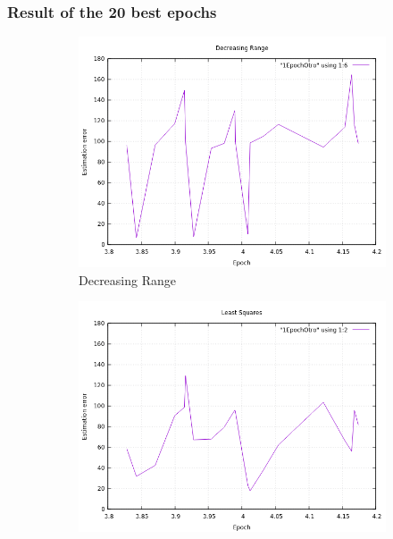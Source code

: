 \clearpage

\subsubsection{Result of the 20 best epochs}

\begin{figure}[!htb]
	\begin{subfigure}[b]{0.5\textwidth}
		\includegraphics[width=\linewidth]{images/resultsStellar/20Epochs1Epoch/1EpochOtroDR.png}
		\caption{Decreasing Range}
	\end{subfigure}
	\hfill
	\begin{subfigure}[b]{0.5\textwidth}
		\includegraphics[width=\linewidth]{images/resultsStellar/20Epochs1Epoch/1EpochOtroLS1.png}

\end{subfigure}
\end{figure}
